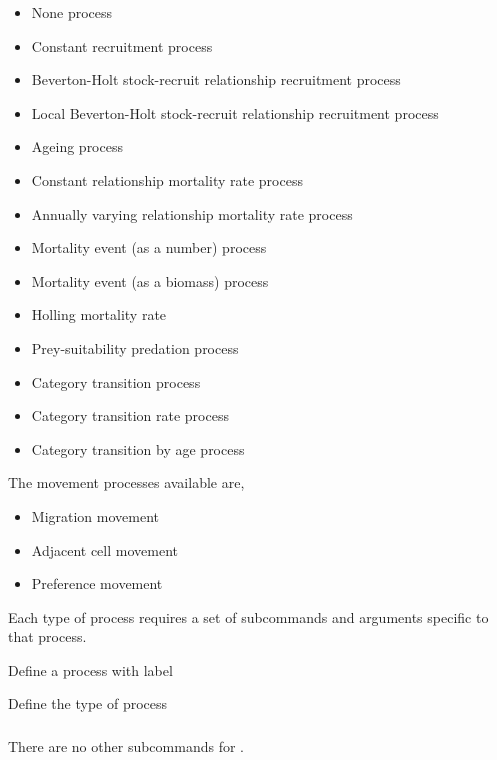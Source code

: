 \begin{itemize}
	\item None process
	\item Constant recruitment process
  \item Beverton-Holt stock-recruit relationship recruitment process
  \item Local Beverton-Holt stock-recruit relationship recruitment process
	\item Ageing process
	\item Constant relationship mortality rate process
	\item Annually varying relationship mortality rate process
	\item Mortality event (as a number) process
	\item Mortality event (as a biomass) process
	\item Holling mortality rate
	\item Prey-suitability predation process
	\item Category transition process
	\item Category transition rate process
	\item Category transition by age process
\end{itemize}

The movement processes available are,

\begin{itemize}
	\item Migration movement
	\item Adjacent cell movement
	\item Preference movement
\end{itemize}

Each type of process requires a set of subcommands and arguments specific to that process.

 {Define a process with label}

 {Define the type of process}

\subsubsection[None]{}

There are no other subcommands for .

\subsubsection[Constant recruitment process]{}

